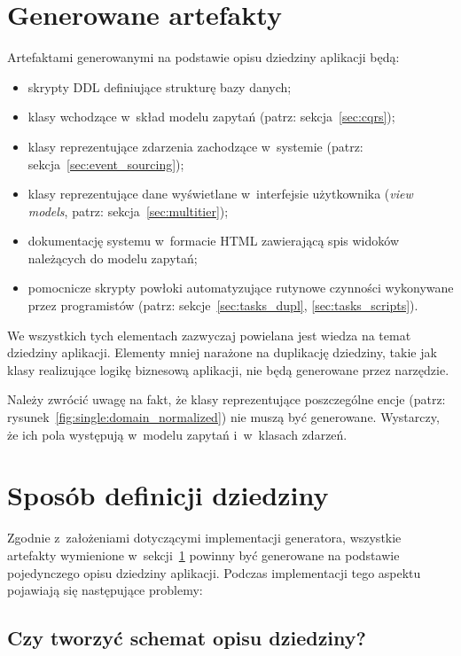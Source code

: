 \section{Generowane artefakty} \label{sec:generated_artifacts}

Artefaktami generowanymi na podstawie opisu dziedziny aplikacji będą:

\begin{itemize}
 \item skrypty DDL definiujące strukturę bazy danych;
 \item klasy wchodzące w~skład modelu zapytań (patrz: sekcja~\ref{sec:cqrs});
 \item klasy reprezentujące zdarzenia zachodzące w~systemie (patrz: sekcja~\ref{sec:event_sourcing});
 \item klasy reprezentujące dane wyświetlane w~interfejsie użytkownika (\emph{view models}, patrz: sekcja~\ref{sec:multitier});
 \item dokumentację systemu w~formacie HTML zawierającą spis widoków należących do modelu zapytań;
 \item pomocnicze skrypty powłoki automatyzujące rutynowe czynności wykonywane przez programistów (patrz: sekcje~\ref{sec:tasks_dupl}, \ref{sec:tasks_scripts}).
\end{itemize}

We wszystkich tych elementach zazwyczaj powielana jest wiedza na temat dziedziny aplikacji.
Elementy mniej narażone na duplikację dziedziny, takie jak klasy realizujące logikę biznesową aplikacji, nie będą generowane przez narzędzie.

Należy zwrócić uwagę na fakt, że klasy reprezentujące poszczególne encje (patrz: rysunek~\ref{fig:single:domain_normalized}) nie muszą być generowane.
Wystarczy, że ich pola występują w~modelu zapytań i~w~klasach zdarzeń.



\section{Sposób definicji dziedziny} \label{sec:domain_schema_definition}

Zgodnie z~założeniami dotyczącymi implementacji generatora, wszystkie artefakty wymienione w~sekcji~\ref{sec:generated_artifacts} powinny być generowane na podstawie pojedynczego opisu dziedziny aplikacji.
Podczas implementacji tego aspektu pojawiają się następujące problemy:


\subsection{Czy tworzyć schemat opisu dziedziny?}

